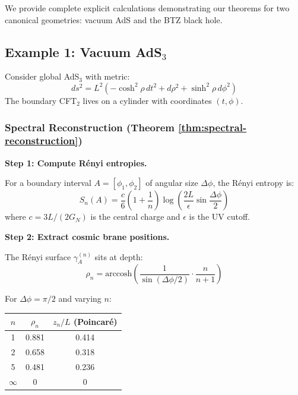 \documentclass[12pt,a4paper]{article}
\begin{document}
We provide complete explicit calculations demonstrating our theorems for two canonical geometries: vacuum AdS and the BTZ black hole.

\subsection{Example 1: Vacuum AdS$_3$}

Consider global AdS$_3$ with metric:
\begin{equation}
ds^2 = L^2\left( -\cosh^2\rho \, dt^2 + d\rho^2 + \sinh^2\rho \, d\phi^2 \right)
\end{equation}
The boundary CFT$_2$ lives on a cylinder with coordinates $(t, \phi)$.

\subsubsection{Spectral Reconstruction (Theorem \ref{thm:spectral-reconstruction})}

\textbf{Step 1: Compute R\'enyi entropies.}

For a boundary interval $A = [\phi_1, \phi_2]$ of angular size $\Delta\phi$, the R\'enyi entropy is:
\begin{equation}
S_n(A) = \frac{c}{6}\left(1 + \frac{1}{n}\right) \log\left( \frac{2L}{\epsilon} \sin\frac{\Delta\phi}{2} \right)
\end{equation}
where $c = 3L/(2G_N)$ is the central charge and $\epsilon$ is the UV cutoff.

\textbf{Step 2: Extract cosmic brane positions.}

The R\'enyi surface $\gamma_A^{(n)}$ sits at depth:
\begin{equation}
\rho_n = \text{arccosh}\left( \frac{1}{\sin(\Delta\phi/2)} \cdot \frac{n}{n+1} \right)
\end{equation}

For $\Delta\phi = \pi/2$ and varying $n$:
\begin{center}
\begin{tabular}{|c|c|c|}
\hline
$n$ & $\rho_n$ & $z_n/L$ (Poincar\'e) \\
\hline
1 & 0.881 & 0.414 \\
2 & 0.658 & 0.318 \\
5 & 0.481 & 0.236 \\
$\infty$ & 0 & 0 \\
\hline
\end{tabular}
\end{center}
\end{document}
